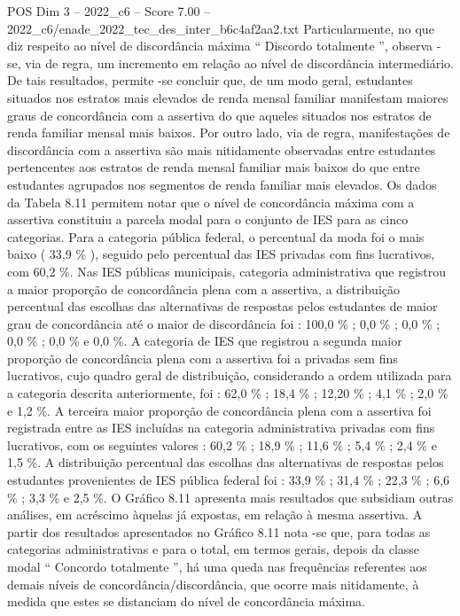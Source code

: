 \begin{textsample}{POS Dim 3 – 2022\_c6 – Score 7.00 – 2022\_c6/enade\_2022\_tec\_des\_inter\_b6c4af2aa2.txt}
Particularmente, no que diz respeito ao nível de discordância máxima “ Discordo totalmente ”, observa -se, via de regra, um incremento em relação ao nível de discordância intermediário.
De tais resultados, permite -se concluir que, de um modo geral, estudantes situados nos estratos mais elevados de renda mensal familiar manifestam maiores graus de concordância com a assertiva do que aqueles situados nos estratos de renda familiar mensal mais baixos.
Por outro lado, via de regra, manifestações de discordância com a assertiva são mais nitidamente observadas entre estudantes pertencentes aos estratos de renda mensal familiar mais baixos do que entre estudantes agrupados nos segmentos de renda familiar mais elevados.
Os dados da Tabela 8.11 permitem notar que o nível de concordância máxima com a assertiva constituiu a parcela modal para o conjunto de IES para as cinco categorias.
Para a categoria pública federal, o percentual da moda foi o mais baixo ( 33,9 \% ), seguido pelo percentual das IES privadas com fins lucrativos, com 60,2 \%.
Nas IES públicas municipais, categoria administrativa que registrou a maior proporção de concordância plena com a assertiva, a distribuição percentual das escolhas das alternativas de respostas pelos estudantes de maior grau de concordância até o maior de discordância foi : 100,0 \% ; 0,0 \% ; 0,0 \% ; 0,0 \% ; 0,0 \% e 0,0 \%.
A categoria de IES que registrou a segunda maior proporção de concordância plena com a assertiva foi a privadas sem fins lucrativos, cujo quadro geral de distribuição, considerando a ordem utilizada para a categoria descrita anteriormente, foi : 62,0 \% ; 18,4 \% ; 12,20 \% ; 4,1 \% ; 2,0 \% e 1,2 \%.
A terceira maior proporção de concordância plena com a assertiva foi registrada entre as IES incluídas na categoria administrativa privadas com fins lucrativos, com os seguintes valores : 60,2 \% ; 18,9 \% ; 11,6 \% ; 5,4 \% ; 2,4 \% e 1,5 \%.
A distribuição percentual das escolhas das alternativas de respostas pelos estudantes provenientes de IES pública federal foi : 33,9 \% ; 31,4 \% ; 22,3 \% ; 6,6 \% ; 3,3 \% e 2,5 \%.
O Gráfico 8.11 apresenta mais resultados que subsidiam outras análises, em acréscimo àquelas já expostas, em relação à mesma assertiva.
A partir dos resultados apresentados no Gráfico 8.11 nota -se que, para todas as categorias administrativas e para o total, em termos gerais, depois da classe modal “ Concordo totalmente ”, há uma queda nas frequências referentes aos demais níveis de concordância/discordância, que ocorre mais nitidamente, à medida que estes se distanciam do nível de concordância máxima.

\end{textsample}
